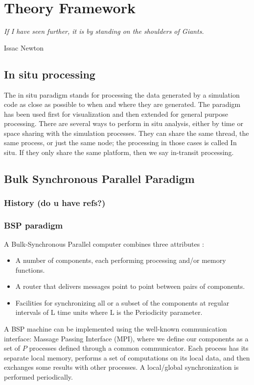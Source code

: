 \chapter{Theory Framework}

\epigraph{\textit{If I have seen further, it is by standing on the shoulders of Giants.}} {Issac Newton}
\newpage


\section{In situ processing}
The in situ paradigm stands for processing the data generated by a simulation code as close as possible to when and where they are generated. The paradigm has been used first for visualization\cite{} and then extended for general purpose processing. There are several ways to perform in situ analysis, either by time or space sharing with the simulation processes. They can share the same thread, the same process, or just the same node; the processing in those cases is called In situ. If they only share the same platform, then we say in-transit processing.



\section{Bulk Synchronous Parallel Paradigm}

\subsection{History (do u have refs?)}
\subsection{BSP paradigm} 
A Bulk-Synchronous Parallel computer combines three attributes : 
\begin{itemize}
    \item A number of components, each performing processing and/or memory functions.
    \item A router that delivers messages point to point between pairs of components.
    \item Facilities for synchronizing all or a subset of the components at regular intervals of L time units where L is the Periodicity parameter.
\end{itemize}

A BSP machine can be implemented using the well-known communication interface: Massage Passing Interface (MPI), where we define our components as a set of $P$ processes defined through a common communicator. Each process has its separate local memory, performs a set of computations on its local data, and then exchanges some results with other processes. A local/global synchronization is performed periodically. 

